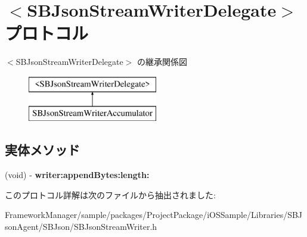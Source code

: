 \hypertarget{protocol_s_b_json_stream_writer_delegate-p}{}\section{$<$S\+B\+Json\+Stream\+Writer\+Delegate$>$ プロトコル}
\label{protocol_s_b_json_stream_writer_delegate-p}
$<$S\+B\+Json\+Stream\+Writer\+Delegate$>$ の継承関係図\begin{figure}[H]
\begin{center}
\leavevmode
\includegraphics[height=2.000000cm]{protocol_s_b_json_stream_writer_delegate-p}
\end{center}
\end{figure}
\subsection*{実体メソッド}
\begin{DoxyCompactItemize}
\item 
\hypertarget{protocol_s_b_json_stream_writer_delegate-p_a969263873e164a2c1032fb26ff92faac}{}(void) -\/ {\bfseries writer\+:append\+Bytes\+:length\+:}\label{protocol_s_b_json_stream_writer_delegate-p_a969263873e164a2c1032fb26ff92faac}

\end{DoxyCompactItemize}


このプロトコル詳解は次のファイルから抽出されました\+:\begin{DoxyCompactItemize}
\item 
Framework\+Manager/sample/packages/\+Project\+Package/i\+O\+S\+Sample/\+Libraries/\+S\+B\+Json\+Agent/\+S\+B\+Json/S\+B\+Json\+Stream\+Writer.\+h\end{DoxyCompactItemize}
